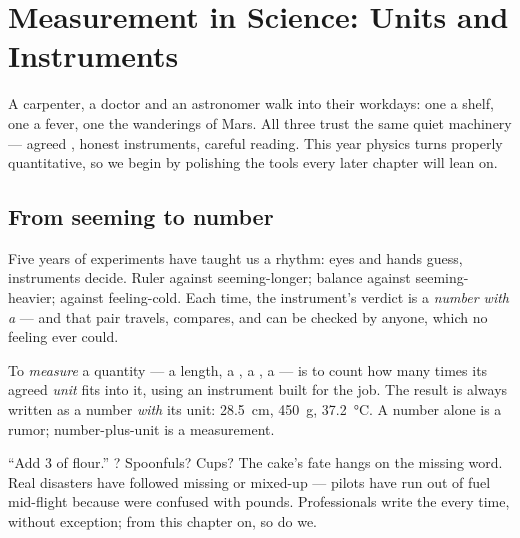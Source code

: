 \chapter{Measurement in Science: Units and Instruments}\label{ch:g6:measurement-in-science}

A carpenter, a doctor and an astronomer walk into their workdays:
one  a shelf, one a fever, one the wanderings of Mars. All
three trust the same quiet machinery --- agreed , honest
instruments, careful reading. This year physics turns properly
quantitative, so we begin by polishing the tools every later
chapter will lean on.

\section{From seeming to number}

Five years of experiments have taught us a rhythm: eyes and hands
guess, instruments decide. Ruler against seeming-longer; balance
against seeming-heavier;  against feeling-cold. Each
time, the instrument's verdict is a \emph{number with a } ---
and that pair travels, compares, and can be checked by anyone,
which no feeling ever could.

\begin{definition}\label{def:g6:measurement-in-science:measuring}
To \emph{measure} a quantity --- a length, a , a
, a  --- is to count how many times its agreed
\emph{unit} fits into it, using an instrument built for
the job. The result is always written as a number \emph{with} its
unit: \qty{28.5}{cm}, \qty{450}{g}, \qty{37.2}{\celsius}. A number
alone is a rumor; number-plus-unit is a measurement.
\end{definition}

\begin{example}\label{ex:g6:measurement-in-science:missing}
``Add 3 of flour.'' ? Spoonfuls? Cups? The cake's fate hangs
on the missing word. Real disasters have followed missing or
mixed-up  --- pilots have run out of fuel mid-flight because
 were confused with pounds. Professionals write the 
every time, without exception; from this chapter on, so do we.
\end{example}


